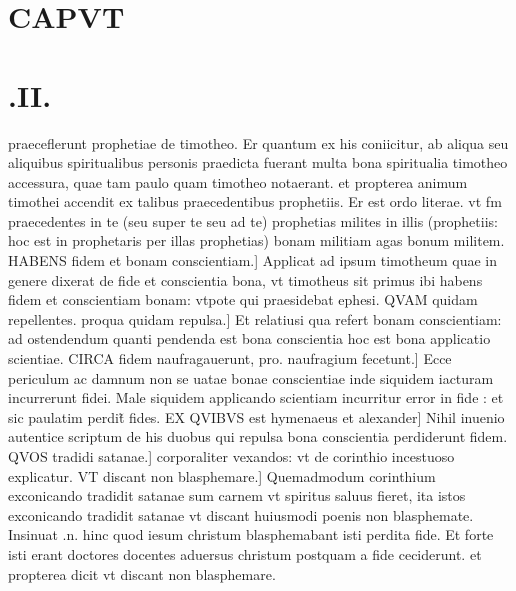 \documentclass{article}
\begin{document}
\begin{pages}
\section*{CAPVT }
\section*{.II. }
\marginpar{[ p.141 ]}\pstart praeceflerunt prophetiae de timotheo. Er quantum ex his coniicitur, ab aliqua seu aliquibus spiritualibus personis praedicta fuerant multa bona spiritualia timotheo accessura, quae tam paulo quam timotheo notaerant. et propterea animum timothei accendit ex talibus praecedentibus prophetiis. Er est ordo literae. vt fm praecedentes in te (seu super te seu ad te) prophetias milites in illis (prophetiis: hoc est in prophetaris per illas prophetias) bonam militiam  agas bonum militem. HABENS fidem et bonam conscientiam.] Applicat ad ipsum timotheum quae in genere dixerat de fide et conscientia bona, vt timotheus sit primus ibi habens fidem et conscientiam bonam: vtpote qui praesidebat ephesi. QVAM quidam repellentes. proqua quidam repulsa.] Et relatiusi qua refert bonam conscientiam: ad ostendendum quanti pendenda est bona conscientia  hoc est bona applicatio scientiae. CIRCA fidem naufragauerunt, pro. naufragium fecetunt.] Ecce periculum ac damnum non se uatae bonae conscientiae inde siquidem iacturam incurrerunt fidei. Male siquidem applicando scientiam  incurritur error in fide : et sic paulatim perdit̃ fides. EX QVIBVS est hymenaeus et alexander] Nihil inuenio autentice scriptum de his duobus qui repulsa bona conscientia perdiderunt fidem. QVOS tradidi satanae.] corporaliter vexandos: vt de corinthio incestuoso explicatur. VT discant non blasphemare.] Quemadmodum corinthium exconicando tradidit satanae sum carnem vt spiritus saluus fieret, ita istos exconicando tradidit satanae vt discant huiusmodi poenis non blasphemate. Insinuat .n. hinc quod iesum christum blasphemabant isti perdita fide. Et forte isti erant doctores docentes aduersus christum postquam a fide ceciderunt. et propterea dicit vt discant non blasphemare.  \pend

\end{pages}
\end{document}

